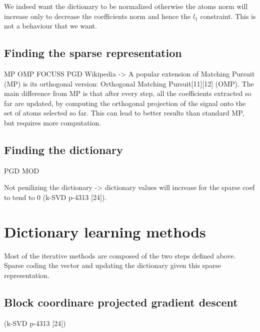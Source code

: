 \documentclass[a4paper,11pt]{article}
\begin{document}
We indeed want the dictionary to be normalized otherwise the atoms norm will increase only to decrease the coefficients norm and hence the $l_1$ constraint.
This is not a behaviour that we want.

\subsection{Finding the sparse representation}
MP OMP FOCUSS \cite{gorodnitsky97} PGD
Wikipedia -> A popular extension of Matching Pursuit (MP) is its orthogonal version: Orthogonal Matching Pursuit[11][12] (OMP). The main difference from MP is that after every step, all the coefficients extracted so far are updated, by computing the orthogonal projection of the signal onto the set of atoms selected so far. This can lead to better results than standard MP, but requires more computation.
\subsection{Finding the dictionary}
PGD MOD

Not penilizing the dictionary -> dictionary values will increase for the sparse coef to tend to 0
\cite{olshausen97} (k-SVD p-4313 [24]).
\section{Dictionary learning methods}
Most of the iterative methods are composed of the two steps defined above.
Sparse coding the vector and updating the dictionary given this sparse representation.


\subsection{Block coordinare projected gradient descent}
\cite{olshausen97} (k-SVD p-4313 [24])
\end{document}
